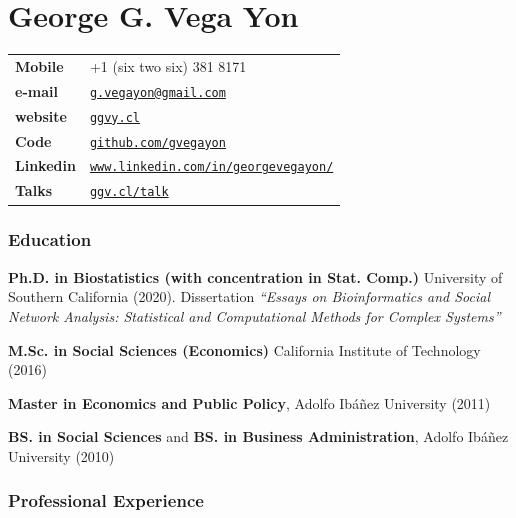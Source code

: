 \documentclass[letterpaper, 11pt]{article}
\def\name{George G. Vega Yon}
\renewenvironment{itemize}{
  \begin{list}{}{
    \setlength{\leftmargin}{0.45cm}
  }
}{
  \end{list}
}
\begin{document}
\part*{\name}



\begin{minipage}{0.50\linewidth}
  \begin{tabular}{>{\bfseries}p{.2\linewidth}p{.79\linewidth}}
    Mobile & +1 (six two six) 381 8171 \\
    e-mail & \href{mailto:g.vegayon@gmail.com}{\tt g.vegayon@gmail.com} \\
    website & \href{https://ggvy.cl}{\tt ggvy.cl} \\
    Code & \href{https://github.com/gvegayon}{\tt github.com/gvegayon}\\
    Linkedin & \href{https://www.linkedin.com/in/georgevegayon/}{\tt www.linkedin.com/in/georgevegayon/} \\
    Talks & \href{https://ggv.cl/talk}{\tt ggv.cl/talk}
  \end{tabular}
\end{minipage}


\section*{Education}

\begin{itemize}
\item 
{\bf Ph.D. in Biostatistics (with concentration in Stat. Comp.)} University of Southern California (2020). Dissertation \emph{``Essays on Bioinformatics and Social Network Analysis: Statistical and Computational Methods for Complex Systems''}

{\bf M.Sc. in Social Sciences (Economics)} California Institute of Technology (2016)

{\bf Master in Economics and Public Policy}, Adolfo Ib\'a\~nez University (2011)

{\bf BS. in Social Sciences} and {\bf BS. in Business Administration}, Adolfo Ib\'a\~nez University (2010)
\end{itemize}

\section*{Professional Experience}
\end{document}

